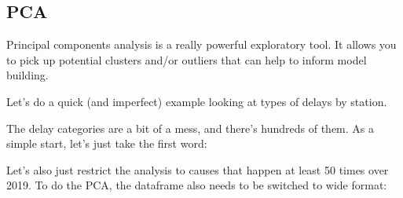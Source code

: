 \documentclass[
]{book}
\newenvironment{Shaded}{\begin{snugshade}}{\end{snugshade}}
\newcommand{\DataTypeTok}[1]{\textcolor[rgb]{0.13,0.29,0.53}{#1}}
\newcommand{\DecValTok}[1]{\textcolor[rgb]{0.00,0.00,0.81}{#1}}
\newcommand{\KeywordTok}[1]{\textcolor[rgb]{0.13,0.29,0.53}{\textbf{#1}}}
\newcommand{\NormalTok}[1]{#1}
\newcommand{\OperatorTok}[1]{\textcolor[rgb]{0.81,0.36,0.00}{\textbf{#1}}}
\newcommand{\OtherTok}[1]{\textcolor[rgb]{0.56,0.35,0.01}{#1}}
\newcommand{\StringTok}[1]{\textcolor[rgb]{0.31,0.60,0.02}{#1}}
\begin{document}
\hypertarget{pca}{%
\subsection{PCA}\label{pca}}

Principal components analysis is a really powerful exploratory tool. It allows you to pick up potential clusters and/or outliers that can help to inform model building.

Let's do a quick (and imperfect) example looking at types of delays by station.

The delay categories are a bit of a mess, and there's hundreds of them. As a simple start, let's just take the first word:

\begin{Shaded}
\end{Shaded}

Let's also just restrict the analysis to causes that happen at least 50 times over 2019. To do the PCA, the dataframe also needs to be switched to wide format:
\end{document}
